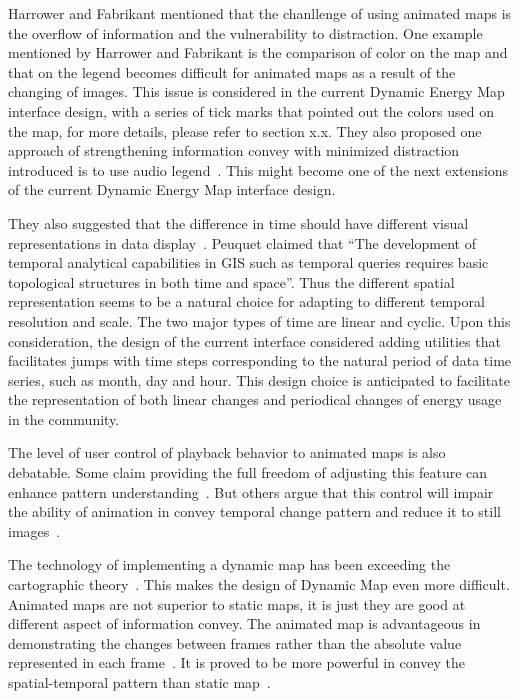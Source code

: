 \documentclass[hidelinks,12pt]{article}
\begin{document}
Harrower and Fabrikant mentioned that the chanllenge of using animated
maps is the overflow of information and the vulnerability to
distraction. One example mentioned by Harrower and Fabrikant is the
comparison of color on the map and that on the legend becomes
difficult for animated maps as a result of the changing of
images. This issue is considered in the current Dynamic Energy Map
interface design, with a series of tick marks that pointed out the
colors used on the map, for more details, please refer to section x.x.
They also proposed one approach of strengthening information convey
with minimized distraction introduced is to use audio
legend~\cite{Harrower2008}. This might become one of the next
extensions of the current Dynamic Energy Map interface design.

They also suggested that the difference in time should have different
visual representations in data display~\cite{Harrower2008}. Peuquet
claimed that ``The development of temporal analytical capabilities in
GIS such as temporal queries requires basic topological structures in
both time and space''. Thus the different spatial representation seems
to be a natural choice for adapting to different temporal resolution
and scale. The two major types of time are linear and cyclic. Upon
this consideration, the design of the current interface considered
adding utilities that facilitates jumps with time steps corresponding
to the natural period of data time series, such as month, day and
hour. This design choice is anticipated to facilitate the
representation of both linear changes and periodical changes of energy
usage in the community.

The level of user control of playback behavior to animated maps is
also debatable. Some claim providing the full freedom of adjusting
this feature can enhance pattern understanding~\cite{Nelson1998}. But
others argue that this control will impair the ability of animation in
convey temporal change pattern and reduce it to still
images~\cite{Lowe2004}.

The technology of implementing a dynamic map has been exceeding the
cartographic theory~\cite{Harrower2008}. This makes the design of
Dynamic Map even more difficult. Animated maps are not superior to
static maps, it is just they are good at different aspect of
information convey. The animated map is advantageous in demonstrating
the changes between frames rather than the absolute value represented
in each frame~\cite{Dorling1992}. It is proved to be more powerful in
convey the spatial-temporal pattern than static
map~\cite{McEachern1998}.
\end{document}
